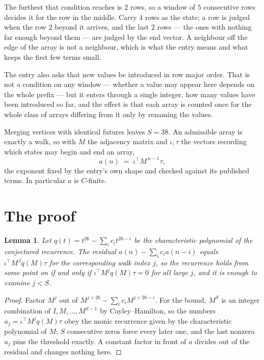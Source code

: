 \documentclass[11pt,a4paper]{article}
\theoremstyle{plain}
\newtheorem{lemma}[theorem]{Lemma}
\theoremstyle{definition}
\begin{document}
The furthest that condition reaches is $2$ rows, so a window of $5$ consecutive rows decides it for the row in the middle. Carry $4$ rows as the state; a row is judged when the row $2$ beyond it arrives, and the last $2$ rows --- the ones with nothing far enough beyond them --- are judged by the end vector. A neighbour off the edge of the array is not a neighbour, which is what the entry means and what keeps the first few terms small.

The entry also asks that new values be introduced in row major order. That is not a condition on any window --- whether a value may appear here depends on the whole prefix --- but it enters through a single integer, how many values have been introduced so far, and the effect is that each array is counted once for the whole class of arrays differing from it only by renaming the values.

Merging vertices with identical futures leaves $S=38$. An admissible array is exactly a walk, so with $M$ the adjacency matrix and $\iota,\tau$ the vectors recording which states may begin and end an array,
\[
a(n)\;=\;\iota^{\!\top}M^{\,n-1}\tau ,
\]
the exponent fixed by the entry's own shape and checked against its published terms. In
particular $a$ is $C$-finite.

\section{The proof}

\begin{lemma}\label{lem:crit}
Let $q(t)=t^{26}-\sum_i c_it^{26-i}$ be the characteristic polynomial of the
conjectured recurrence. The residual $a(n)-\sum_ic_ia(n-i)$ equals
$\iota^{\!\top}M^{\,j}q(M)\tau$ for the corresponding walk index $j$, so the recurrence
holds from some point on if and only if $\iota^{\!\top}M^{j}q(M)\tau=0$ for all large $j$,
and it is enough to examine $j<S$.
\end{lemma}

\begin{proof}
Factor $M^{j}$ out of $M^{j+26}-\sum_ic_iM^{j+26-i}$. For the bound, $M^{S}$
is an integer combination of $I,M,\dots,M^{S-1}$ by Cayley--Hamilton, so the numbers
$u_j=\iota^{\!\top}M^{j}q(M)\tau$ obey the monic recurrence given by the characteristic
polynomial of $M$; $S$ consecutive zeros force every later one, and the last nonzero $u_j$
pins the threshold exactly. A constant factor in front of $a$ divides out of the residual and
changes nothing here.
\end{proof}
\end{document}
